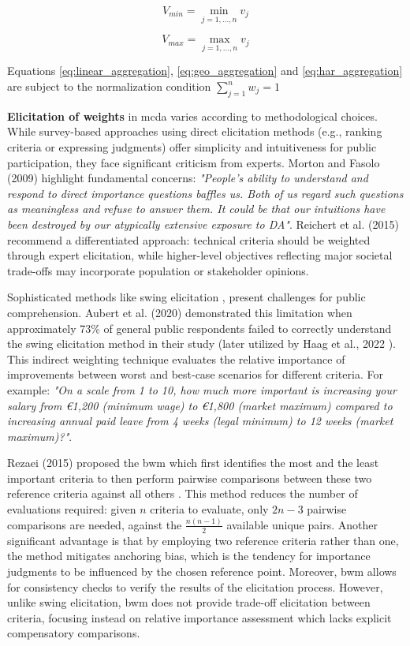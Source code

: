 \begin{equation}
   V_{min} = \min_{j=1,\dots,n} v_j
   \label{eq:min_aggregation}
\end{equation}

\begin{equation}
   V_{max} = \max_{j=1,\dots,n} v_j
   \label{eq:max_aggregation}
\end{equation}


Equations \ref{eq:linear_aggregation}, \ref{eq:geo_aggregation} and \ref{eq:har_aggregation} are subject to the normalization condition $\sum_{j=1}^{n} w_j = 1$

\textbf{Elicitation of weights} in \gls{mcda} varies according to methodological choices. While survey-based approaches using direct elicitation methods (e.g., ranking criteria or expressing judgments) offer simplicity and intuitiveness for public participation, they face significant criticism from experts. Morton and Fasolo (2009) \cite{Morton01022009} highlight fundamental concerns: \textit{"People's ability to understand and respond to direct importance questions baffles us. Both of us regard such questions as meaningless and refuse to answer them. It could be that our intuitions have been destroyed by our atypically extensive exposure to DA"}. Reichert et al. (2015) \cite{REICHERT2015316} recommend a differentiated approach: technical criteria should be weighted through expert elicitation, while higher-level objectives reflecting major societal trade-offs may incorporate population or stakeholder opinions.

Sophisticated methods like swing elicitation \cite{Goodwin_Wright_2004}, present challenges for public comprehension. Aubert et al. (2020) \cite{AUBERT2020100156} demonstrated this limitation when approximately 73\% of general public respondents failed to correctly understand the swing elicitation method in their study (later utilized by Haag et al., 2022 \cite{HAAG2022105361}). This indirect weighting technique evaluates the relative importance of improvements between worst and best-case scenarios for different criteria. For example: \textit{"On a scale from 1 to 10, how much more important is increasing your salary from €1,200 (minimum wage) to €1,800 (market maximum) compared to increasing annual paid leave from 4 weeks (legal minimum) to 12 weeks (market maximum)?"}.

Rezaei (2015) proposed the \gls{bwm} which first identifies the most and the least important criteria to then perform pairwise comparisons between these two reference criteria against all others \cite{REZAEI201549}. This method reduces the number of evaluations required: given $n$ criteria to evaluate, only $2n-3$ pairwise comparisons are needed, against the $\frac{n(n-1)}{2}$ available unique pairs. Another significant advantage is that by employing two reference criteria rather than one, the method mitigates anchoring bias, which is the tendency for importance judgments to be influenced by the chosen reference point. Moreover, \gls{bwm} allows for consistency checks to verify the results of the elicitation process. However, unlike swing elicitation, \gls{bwm} does not provide trade-off elicitation between criteria, focusing instead on relative importance assessment which lacks explicit compensatory comparisons.

